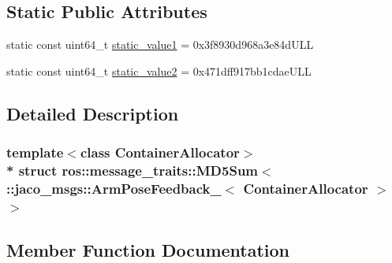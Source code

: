 \subsection*{Static Public Attributes}
\begin{DoxyCompactItemize}
\item 
static const uint64\+\_\+t \hyperlink{structros_1_1message__traits_1_1MD5Sum_3_01_1_1jaco__msgs_1_1ArmPoseFeedback___3_01ContainerAllocator_01_4_01_4_ad1eb5d4c62402ea75402a4a086575874}{static\+\_\+value1} = 0x3f8930d968a3e84d\+U\+LL
\item 
static const uint64\+\_\+t \hyperlink{structros_1_1message__traits_1_1MD5Sum_3_01_1_1jaco__msgs_1_1ArmPoseFeedback___3_01ContainerAllocator_01_4_01_4_a149ff1391e9d1c20540fba1c267182a0}{static\+\_\+value2} = 0x471dff917bb1cdae\+U\+LL
\end{DoxyCompactItemize}


\subsection{Detailed Description}
\subsubsection*{template$<$class Container\+Allocator$>$\\*
struct ros\+::message\+\_\+traits\+::\+M\+D5\+Sum$<$ \+::jaco\+\_\+msgs\+::\+Arm\+Pose\+Feedback\+\_\+$<$ Container\+Allocator $>$ $>$}



\subsection{Member Function Documentation}
